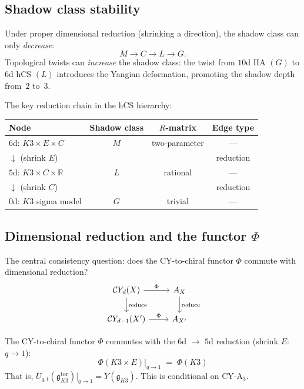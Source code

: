 \subsection{Shadow class stability}
\label{sec:shadow-class-stability}

Under proper dimensional reduction (shrinking a direction), the shadow class
can only \emph{decrease}:
\[
  M \to C \to L \to G.
\]
Topological twists can \emph{increase} the shadow class: the twist from
$10$d IIA $(G)$ to $6$d hCS $(L)$ introduces the Yangian deformation,
promoting the shadow depth from~$2$ to~$3$.

The key reduction chain in the hCS hierarchy:
\begin{center}
\renewcommand{\arraystretch}{1.3}
\begin{tabular}{lccc}
\hline
\textbf{Node} & \textbf{Shadow class} & \textbf{$R$-matrix} & \textbf{Edge type} \\
\hline
$6$d: $K3 \times E \times C$ & $M$ & two-parameter & --- \\
$\downarrow$ (shrink $E$) & & & reduction \\
$5$d: $K3 \times C \times \mathbb{R}$ & $L$ & rational & --- \\
$\downarrow$ (shrink $C$) & & & reduction \\
$0$d: $K3$ sigma model & $G$ & trivial & --- \\
\hline
\end{tabular}
\end{center}

\subsection{Dimensional reduction and the functor $\Phi$}
\label{sec:dimred-commutativity}

The central consistency question: does the CY-to-chiral functor $\Phi$
commute with dimensional reduction?
\[
\begin{tikzcd}
  \mathcal{C}\!\mathit{Y}_d(X) \ar[r, "\Phi"] \ar[d, "\text{reduce}"]
    & A_X \ar[d, "\text{reduce}"] \\
  \mathcal{C}\!\mathit{Y}_{d-1}(X') \ar[r, "\Phi"]
    & A_{X'}
\end{tikzcd}
\]

\begin{conjecture}
\label{conj:compactification-commutativity}
\ClaimStatusConjectured
The CY-to-chiral functor $\Phi$ commutes with the $6$d $\to$ $5$d
reduction (shrink $E$: $q \to 1$):
\[
  \Phi(K3 \times E)\big|_{q \to 1}
  \;=\;
  \Phi(K3)
\]
That is, $U_{q,t}(\mathfrak{g}_{K3}^{\mathrm{tor}})\big|_{q \to 1}
= Y(\mathfrak{g}_{K3})$.
This is conditional on \textup{CY-A}$_3$.
\end{conjecture}

